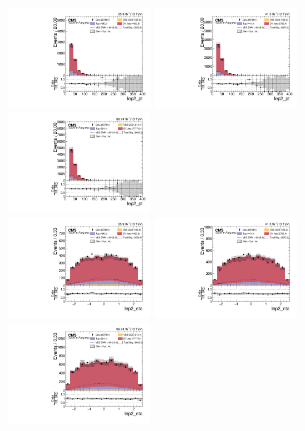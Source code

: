 \begin{figure}[!ht]
  \centering
  \includegraphics[width=0.335\textwidth]{analysis_plots/2016_zjj/cr_vjets_m/lep2_pt.pdf} \hspace{-10pt}
  \includegraphics[width=0.335\textwidth]{analysis_plots/2017_zjj/cr_vjets_m/lep2_pt.pdf} \hspace{-10pt}
  \includegraphics[width=0.335\textwidth]{analysis_plots/2018_zjj/cr_vjets_m/lep2_pt.pdf} \hspace{-10pt} \\
  \includegraphics[width=0.335\textwidth]{analysis_plots/2016_zjj/cr_vjets_m/lep2_eta.pdf} \hspace{-10pt}
  \includegraphics[width=0.335\textwidth]{analysis_plots/2017_zjj/cr_vjets_m/lep2_eta.pdf} \hspace{-10pt}
  \includegraphics[width=0.335\textwidth]{analysis_plots/2018_zjj/cr_vjets_m/lep2_eta.pdf} \hspace{-10pt} \\

\end{figure}
